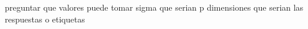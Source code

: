 preguntar que valores puede tomar sigma
que serian p dimensiones
que serian las respuestas o etiquetas